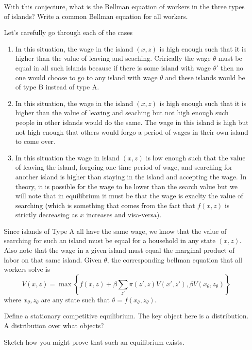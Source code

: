 \documentclass[11pt,english]{article}
\begin{document}
\noindent With this conjecture, what is the Bellman equation of workers in the three
types of islands? Write a common Bellman equation for all workers.
 \begin{solution}
 Let's carefully go through each of the cases
\begin{enumerate}
\item[(IA)] In this situation, the wage in the island $(x,z)$ is high enough such that it is higher than the value of leaving and seaching. Crirically the wage $\theta$ must be equal in all such islands because if there is some island with wage $\theta'$ then no one would choose to go to any island with wage $\theta$ and these islands would be of type B instead of type A.
\item[(IB)] In this situation, the wage in the island $(x,z)$ is high enough such that it is higher than the value of leaving and seaching but not high enough such people in other islands would do the same. The wage in this island is high but not high enough that others would forgo a period of wages in their own island to come over.
\item[(IC)] In this situation the wage in island $(x, z)$ is low enough such that the value of leaving the island, forgoing one time period of wage, and searching for another island is higher than staying in the island and accepting the wage. In theory, it is possible for the wage to be lower than the search value but we will note that in equilibrium it must be that the wage is exaclty the value of searching (which is something that comes from the fact that $f(x, z)$ is strictly decreasing as $x$ increases and visa-versa).
\end{enumerate}
Since islands of Type A all have the same wage, we know that the value of searching for such an island must be equal for a household in any state $(x, z)$. Also note that the wage in a given island must equal the marginal product of labor on that same island. Given $\theta$, the corresponding bellman equation that all workers solve is
$$V(x,z) = \max\left\{f(x,z) + \beta\sum_{z'}\pi(z', z)V(x',z'), \beta V(x_\theta, z_\theta)\right\}$$ where $x_\theta, z_\theta$ are any state such that $\theta  = f(x_\theta, z_\theta)$.

\end{solution}
\noindent Define a stationary competitive equilibrium. The key object here is a
distribution. A distribution over what objects?
 \begin{solution}
 
\end{solution}
\noindent Sketch how you might prove that such an equilibrium exists.
 \begin{solution}
 
\end{solution}
\end{document}
